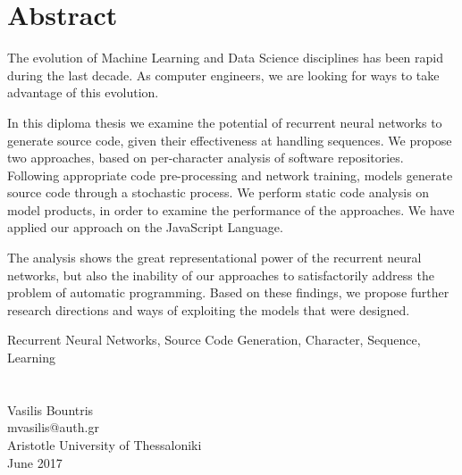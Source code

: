 \begin{abstracteng}

\section*{Abstract}
The evolution of Machine Learning and Data Science disciplines has been rapid during the last decade.
As computer engineers, we are looking for ways to take advantage of this evolution.

In this diploma thesis we examine the potential of recurrent neural networks to generate source code, given their effectiveness at handling sequences.
We propose two approaches, based on per-character analysis of software repositories. 
Following appropriate code pre-processing and network training, models generate source code through a stochastic process.
We perform static code analysis on model products, in order to examine the performance of the approaches.
We have applied our approach on the JavaScript Language.

The analysis shows the great representational power of the recurrent neural networks, but also the inability of our approaches to satisfactorily address the problem of automatic programming. Based on these findings, we propose further research directions and ways of exploiting the models that were designed.


   \begin{keywordseng}
    Recurrent Neural Networks, Source Code Generation, Character, Sequence, Learning
   \end{keywordseng}
\section*{}
\noindent
Vasilis Bountris\\
mvasilis@auth.gr\\
Aristotle University of Thessaloniki\\
June 2017

\end{abstracteng}
